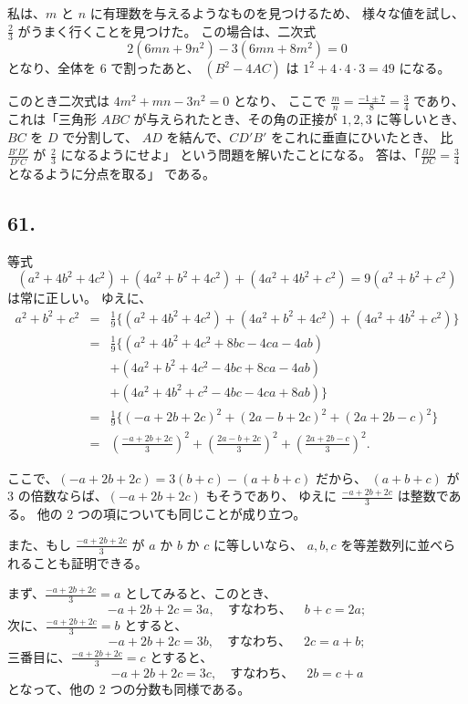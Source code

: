 私は、$m$ と $n$ に有理数を与えるようなものを見つけるため、
様々な値を試し、$\frac{2}{3}$ がうまく行くことを見つけた。
この場合は、二次式
\[
2( 6 mn + 9 n^2) - 3(6mn + 8m^2) = 0
\]
となり、全体を $6$ で割ったあと、
$(B^2 - 4AC)$ は $1^2 + 4 \cdot 4 \cdot 3 = 49$ になる。

このとき二次式は $4 m^2 + mn - 3n^2 = 0$ となり、
ここで $\frac{m}{n} = \frac{-1 \pm 7}{8} = \frac{3}{4}$ であり、
これは「三角形 $ABC$ が与えられたとき、その角の正接が $1, 2, 3$
に等しいとき、$BC$ を $D$ で分割して、
$AD$ を結んで、$CD'B'$ をこれに垂直にひいたとき、
比 $\frac{B'D'}{D'C}$ が $\frac{2}{3}$ になるようにせよ」
という問題を解いたことになる。
答は、「$\frac{BD}{DC} = \frac{3}{4}$ となるように分点を取る」
である。

\subsection*{61.}

等式
\[
(a^2 + 4b^2 + 4c^2) + (4 a^2 + b^2 + 4c^2) + (4a^2 + 4b^2 + c^2)
= 9 (a^2 + b^2 + c^2)
\]
は常に正しい。
ゆえに、
\begin{eqnarray*}
a^2 + b^2 + c^2
&=& \frac{1}{9} \{
(a^2 + 4b^2 + 4c^2) + (4 a^2 + b^2 + 4c^2) + (4a^2 + 4b^2 + c^2)
\}\\
&=& \frac{1}{9} \{
(a^2 + 4b^2 + 4c^2 + 8bc - 4ca - 4ab)\\
&&+ (4 a^2 + b^2 + 4c^2 - 4bc + 8ca - 4ab)\\
&&+ (4a^2 + 4b^2 + c^2 - 4bc - 4ca + 8ab) \}\\
&=& \frac{1}{9} \{
(-a+2b+2c)^2 + (2a-b+2c)^2 + (2a+2b-c)^2 \}\\
&=&
\left( \frac{-a+2b+2c}{3} \right)^2
+ \left( \frac{2a-b+2c}{3} \right)^2
+ \left( \frac{2a+2b-c}{3} \right)^2.
\end{eqnarray*}

ここで、$(-a + 2b + 2c) = 3(b + c) - (a + b + c)$ だから、
$(a + b + c)$ が $3$ の倍数ならば、$(-a + 2b + 2c)$ もそうであり、
ゆえに $\frac{-a + 2b + 2c}{3}$ は整数である。
他の 2 つの項についても同じことが成り立つ。

また、もし $\frac{-a + 2b + 2c}{3}$ が $a$ か $b$ か $c$ に等しいなら、
$a, b, c$ を等差数列に並べられることも証明できる。

まず、$\frac{-a + 2b + 2c}{3} = a$ としてみると、このとき、
\[
-a + 2b + 2c = 3a, \quad \mbox{すなわち、}
\quad b + c = 2a;
\]
次に、$\frac{-a + 2b + 2c}{3} = b$ とすると、
\[
-a + 2b + 2c = 3b, \quad \mbox{すなわち、}
\quad 2c = a + b;
\]
三番目に、$\frac{-a + 2b + 2c}{3} = c$ とすると、
\[
-a + 2b + 2c = 3c, \quad \mbox{すなわち、}
\quad 2b = c + a
\]
となって、他の 2 つの分数も同様である。

